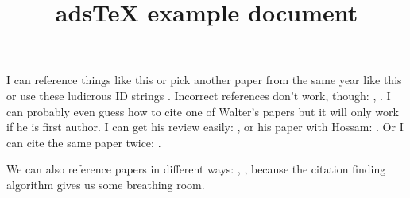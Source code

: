 \documentclass[10pt,a4paper]{article}
\begin{document}
\title{adsTeX example document}
\maketitle
I can reference things like this \cite{THands2014MNRAS} or pick another paper from the same year like this \cite{THands2014IAUS} or use these ludicrous ID strings \citep{2014MNRAS.445.2285D}. Incorrect references don't work, though: \cite{MBlobbyNEdmonds1990}, \cite{3123MNRAS.123.123D}. I can probably even guess how to cite one of Walter's papers \citep{WDehnen2000MNRAS} but it will only work if he is first author. I can get his review easily: \cite{DehnenRead2011}, or his paper with Hossam: \cite{DehnenHAly2012}. Or I can cite the same paper twice: \cite{THands2014MNRAS}.

We can also reference papers in different ways: \cite{rein2009A&A}, \cite{Swift2013ApJ}, because the citation finding algorithm gives us some breathing room.

\end{document}
